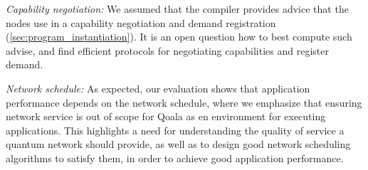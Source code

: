 \textit{Capability negotiation:}
We assumed that the compiler provides advice that the nodes use in a capability negotiation and demand registration (\cref{sec:program_instantiation}).
It is an open question how to best compute such advise, and find efficient protocols for negotiating capabilities and register demand.

\textit{Network schedule:}
As expected, our evaluation shows that application performance depends on the network schedule, where we emphasize that ensuring network service is out of scope for Qoala as en environment for executing applications.
This highlights a need for understanding the quality of service a quantum network should provide, as well as to design good network scheduling algorithms to satisfy them, in order to achieve good application performance.
